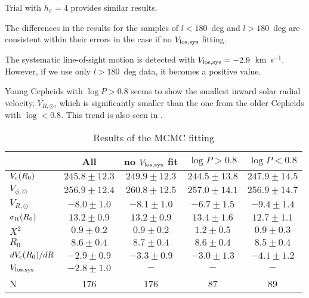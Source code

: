 \documentclass[11pt,a4paper]{article}
\begin{document}
Trial with $h_{\sigma}=4$ provides similar results. 

The differences in the results for the samples of $l<180$~deg and $l>180$~deg are consistent within their errors in the case if no $V_{\rm los,sys}$ fitting. 

The systematic line-of-sight motion is detected with $V_{\rm los,sys}=-2.9$~km~s$^{-1}$. However, if we use only $l>180$~deg data, it becomes a positive value. 

Young Cepheids with $\log P>0.8$ seems to show the smallest inward solar radial velocity, $V_{R,\odot}$, which is significantly smaller than the one from the older Cepheids with $\log<0.8$. This trend is also seen in \citet{vvb17a}.


\begin{table}
\centering
 \caption{Results of the MCMC fitting}
 \label{tab:MCMC-res}
 \begin{tabular}{lcccc}
  \hline
                                        & All                 &  no $V_{\rm los,sys}$ fit & $\log P>0.8$ & $\log P<0.8$ \\
 \hline
 $V_{\rm c}(R_0)$            & $245.8\pm  12.3$ & $249.9\pm  12.3$ & $244.5\pm  13.8$ & $247.9\pm  14.5$ \\
 
 $V_{\phi,\odot}$              & $256.9\pm  12.4$ & $260.8\pm  12.5$ & $257.0\pm  14.1$ & $256.9\pm  14.7$ \\

 $V_{R,\odot}$                 & $ -8.0\pm   1.0$    & $ -8.1\pm   1.0$    & $ -6.7\pm   1.5$ & $ -9.4\pm   1.4$ \\

 $\sigma_{\rm R}(R_0)$   & $ 13.2\pm   0.9$   & $ 13.2\pm   0.9$   & $ 13.4\pm   1.6$ & $ 12.7\pm   1.1$ \\

 $X^2$                             & $  0.9\pm   0.2$   & $  0.9\pm   0.2$    &   $  1.2\pm   0.5$ & $  0.9\pm   0.3$ \\

 $R_0$                             &  $  8.6\pm   0.4$    & $  8.7\pm   0.4$    & $  8.6\pm   0.4$ & $  8.5\pm   0.4$ \\
  
 $dV_{\rm c}(R_0)/dR$     & $ -2.9\pm   0.9$    & $ -3.3\pm   0.9$   & $ -3.0\pm   1.3$ & $ -4.1\pm   1.2$ \\

 $V_{\rm los,sys}$            & $ -2.8\pm   1.0$    & $-$                       &  $-$                       &  $-$                       \\ 

 N                                      & 176                       & 176                     &  87                         & 89 \\
 
\hline
\end{tabular}
\end{table}
\end{document}
